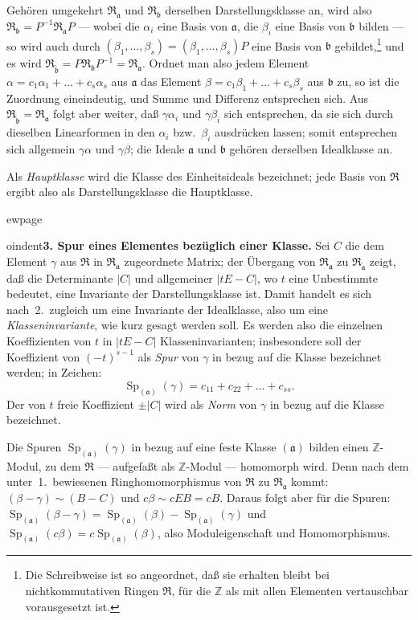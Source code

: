 \documentclass[12pt,a4paper]{article}
\newcommand{\mf}[1]{\mathfrak{#1}}     %
\newcommand{\ideala}{\mathfrak{a}}
\newcommand{\idealb}{\mathfrak{b}}
\newcommand{\ZZ}{\mathbb{Z}}            %
\DeclareMathOperator{\Sp}{Sp}           %
\theoremstyle{definition}
\begin{document}
Geh\"oren umgekehrt $\mf{R}_{\ideala}$ und $\mf{R}_{\idealb}$ derselben
Darstellungsklasse an, wird also $\mf{R}_{\idealb} =
P^{-1}\mf{R}_{\ideala}P$ --- wobei die $\alpha_i$ eine Basis von
$\ideala$, die $\beta_i$ eine Basis von $\idealb$ bilden --- so wird auch
durch $(\beta_1,\dots,\beta_s) = (\beta_1,\dots,\beta_s)P$ eine Basis von
$\idealb$ gebildet,\footnote{Die Schreibweise ist so angeordnet, da\ss{} sie
erhalten bleibt bei nichtkommutativen Ringen $\mf{R}$, f\"ur die $\ZZ$ als mit
allen Elementen vertauschbar vorausgesetzt ist.} und es wird
$\mf{R}_{\tilde{\idealb}} = P\mf{R}_{\idealb}P^{-1} = \mf{R}_{\ideala}$.
Ordnet man also jedem Element $\alpha = c_1\alpha_1 + \dots + c_s\alpha_s$
aus $\ideala$ das Element $\beta = c_1\beta_1 + \dots + c_s\beta_s$ aus
$\idealb$ zu, so ist die Zuordnung eineindeutig, und Summe und Differenz
entsprechen sich. Aus $\mf{R}_{\tilde{\idealb}} = \mf{R}_{\ideala}$ folgt aber
weiter, da\ss{} $\gamma\alpha_i$ und $\gamma\beta_i$ sich entsprechen, da sie sich
durch dieselben Linearformen in den $\alpha_i$ bzw.\ $\beta_i$ ausdr\"ucken
lassen; somit entsprechen sich allgemein $\gamma\alpha$ und $\gamma\beta$; die
Ideale $\ideala$ und $\idealb$ geh\"oren derselben Idealklasse an.

Als \textit{Hauptklasse} wird die Klasse des Einheitsideals bezeichnet; jede
Basis von $\mf{R}$ ergibt also als Darstellungsklasse die Hauptklasse.



ewpage
\setcounter{page}{555}



oindent\textbf{3. Spur eines Elementes bez\"uglich einer Klasse.} Sei $C$
die dem Element $\gamma$ aus $\mf{R}$ in $\mf{R}_{\ideala}$ zugeordnete
Matrix; der \"Ubergang von $\mf{R}_{\ideala}$ zu $\mf{R}_{\tilde{\ideala}}$
zeigt, da\ss{} die Determinante $|C|$ und allgemeiner $|tE - C|$, wo $t$ eine
Unbestimmte bedeutet, eine Invariante der Darstellungsklasse ist. Damit
handelt es sich nach~2.\ zugleich um eine Invariante der Idealklasse, also
um eine \textit{Klasseninvariante}, wie kurz gesagt werden soll. Es werden also
die einzelnen Koeffizienten von $t$ in $|tE - C|$ Klasseninvarianten;
insbesondere soll der Koeffizient von $(-t)^{s-1}$ als \textit{Spur} von $\gamma$
in bezug auf die Klasse bezeichnet werden; in Zeichen:
\[
\Sp_{(\ideala)}(\gamma) = c_{11} + c_{22} + \dots + c_{ss}.
\]
Der von $t$ freie Koeffizient $\pm|C|$ wird als \textit{Norm} von $\gamma$ in
bezug auf die Klasse bezeichnet.

Die Spuren $\Sp_{(\ideala)}(\gamma)$ in bezug auf eine feste Klasse
$(\ideala)$ bilden einen $\ZZ$-Modul, zu dem $\mf{R}$ --- aufgefa\ss t als
$\ZZ$-Modul --- homomorph wird. Denn nach dem unter~1.\ bewiesenen
Ringhomomorphismus von $\mf{R}$ zu $\mf{R}_{\ideala}$ kommt:
$(\beta-\gamma) \sim (B-C)$ und $c\beta \sim cE B = cB$. Daraus folgt
aber f\"ur die Spuren:
$\Sp_{(\ideala)}(\beta-\gamma) = \Sp_{(\ideala)}(\beta) - \Sp_{(\ideala)}(\gamma)$
und $\Sp_{(\ideala)}(c\beta) = c\Sp_{(\ideala)}(\beta)$, also
Moduleigenschaft und Homomorphismus.
\end{document}
